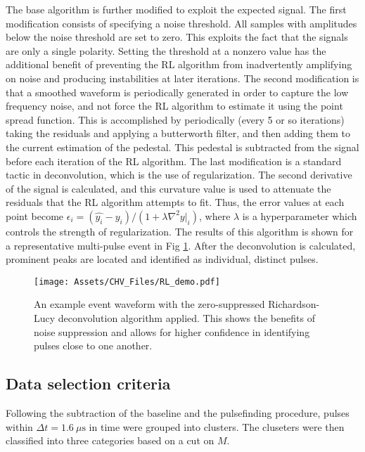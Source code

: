 The base algorithm is further modified to exploit the expected signal.
The first modification consists of specifying a noise threshold. 
All samples with amplitudes below the noise threshold are set to zero. This exploits the fact that the signals are only a single polarity.
Setting the threshold at a nonzero value has the additional benefit of preventing the RL algorithm from inadvertently amplifying on noise and producing instabilities at later iterations.
The second modification is that a smoothed waveform is periodically generated in order to capture the low frequency noise, and not force the RL algorithm to estimate it using the point spread function.
This is accomplished by periodically (every 5 or so iterations) taking the residuals and applying a butterworth filter, and then adding them to the current estimation of the pedestal.
This pedestal is subtracted from the signal before each iteration of the RL algorithm.
The last modification is a standard tactic in deconvolution, which is the use of regularization.
The second derivative of the signal is calculated, and this curvature value is used to attenuate the residuals that the RL algorithm attempts to fit. 
Thus, the error values at each point become $\epsilon_i = (\hat{y_i}-y_i)/(1+\lambda \nabla^2 y|_i)$, where $\lambda$ is a hyperparameter which controls the strength of regularization.
The results of this algorithm is shown for a representative multi-pulse event in Fig \ref{fig:richardson_lucy_example}.
After the deconvolution is calculated, prominent peaks are located and identified as individual, distinct pulses.

\begin{figure}
    \centering
    \texttt{[image: Assets/CHV\_Files/RL\_demo.pdf]}
    \caption[An example CHV prototype test event waveform with the zero-suppressed Richardson-Lucy deconvolution algorithm applied.]%
    {An example event waveform with the zero-suppressed Richardson-Lucy deconvolution algorithm applied.
    This shows the benefits of noise suppression and allows for higher confidence in identifying pulses close to one another.}
    \label{fig:richardson_lucy_example}
\end{figure}

\subsection {Data selection criteria}
Following the subtraction of the baseline and the pulsefinding procedure, pulses within $\Delta t = 1.6~\mu \mathrm{s}$ in time were grouped into clusters.
The cluseters were then classified into three categories based on a cut on $M$.

